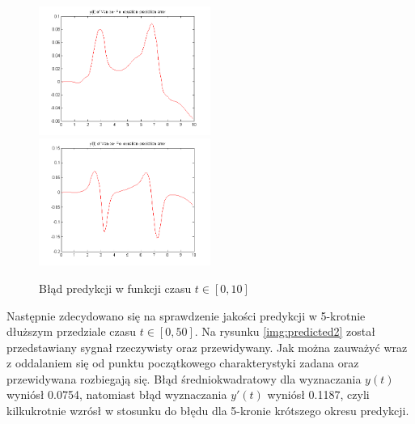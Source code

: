 \begin{figure}[ht!]
	\centering

	\subfloat
	{\includegraphics[width=0.5\textwidth]
	{images/err100_x1.png}}
	\subfloat
	{\includegraphics[width=0.5\textwidth]
	{images/err100_x2.png}}	
	

	\caption{Błąd predykcji w funkcji czasu $t \in [0,10]$}
	\label{img:err100_x}
\end{figure}


Następnie zdecydowano się na sprawdzenie jakości predykcji w 5-krotnie dłuższym przedziale czasu $t \in [0, 50]$. Na rysunku \ref{img:predicted2} został przedstawiany sygnał rzeczywisty oraz przewidywany. Jak można zauważyć wraz z oddalaniem się od punktu początkowego charakterystyki zadana oraz przewidywana rozbiegają się. Błąd średniokwadratowy dla wyznaczania $y(t)$ wyniósł  0.0754, natomiast błąd wyznaczania $y'(t)$ wyniósł 0.1187, czyli kilkukrotnie wzrósł w stosunku do błędu dla 5-kronie krótszego okresu predykcji.


